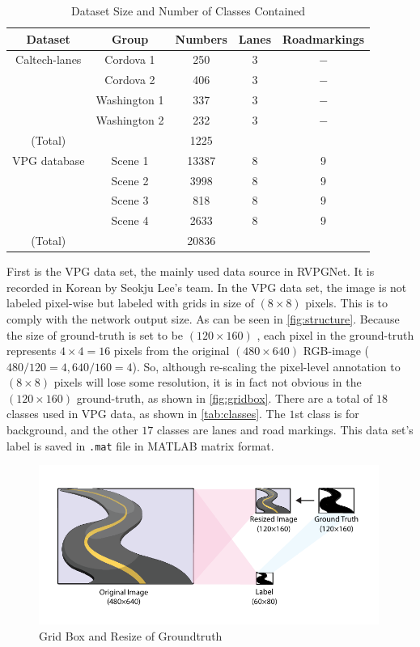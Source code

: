 \begin{spacing}{1.5}
\begin{table}[ht]
\centering
\caption{Dataset Size and Number of Classes Contained}
\label{tab:dataset}
\begin{tabular}{@{}ccccc@{}}
\toprule
Dataset & Group & Numbers & Lanes & Roadmarkings \\ \midrule
Caltech-lanes & Cordova 1 & 250 & 3 & $-$ \\
 & Cordova 2 & 406 & 3 & $-$ \\
 & Washington 1 & 337 & 3 & $-$ \\
 & Washington 2 & 232 & 3 & $-$ \\
(Total) &  & 1225 &  &  \\
VPG database & Scene 1 & 13387 & 8 & 9 \\
 & Scene 2 & 3998 & 8 & 9 \\
 & Scene 3 & 818 & 8 & 9 \\
 & Scene 4 & 2633 & 8 & 9 \\
(Total) &  & 20836 &  &  \\ \bottomrule
\end{tabular}
\end{table}

First is the VPG data set, the mainly used data source in RVPGNet. It is recorded in Korean by Seokju Lee's team. In the VPG data set, the image is not labeled pixel-wise but labeled with grids in size of $(8 \times 8)$ pixels. This is to comply with the network output size. As can be seen in \autoref{fig:structure}. Because the size of ground-truth is set to be $(120 \times 160)$ , each pixel in the ground-truth represents $4 \times 4 = 16$ pixels from the original $(480 \times 640)$ RGB-image ($480/120 = 4, 640/160 =  4$). So, although re-scaling the pixel-level annotation to $(8\times 8)$ pixels will lose some resolution, it is in fact not obvious in the $(120 \times 160)$ ground-truth, as shown in \autoref{fig:gridbox}. There are a total of $18$ classes used in VPG data, as shown in \autoref{tab:classes}. The $1$st class is for background, and the other $17$ classes are lanes and road markings. This data set's label is saved in \texttt{.mat} file in MATLAB matrix format.

\begin{figure}[ht]
\centering
\includegraphics[width=0.99\textwidth, fbox]{Chapter3/gridbox.pdf}
\caption{Grid Box and Resize of Groundtruth}
\label{fig:gridbox} 
\end{figure}


\end{spacing}
